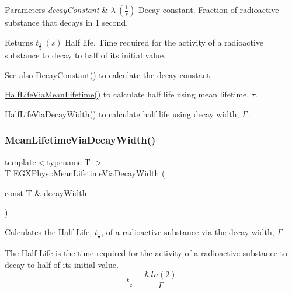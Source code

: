 \begin{DoxyParams}{Parameters}
{\em decay\+Constant} & $\lambda\ (\frac{1}{s})$ Decay constant. Fraction of radioactive substance that decays in 1 second. \\
\hline
\end{DoxyParams}
\begin{DoxyReturn}{Returns}
$t_{\frac{1}{2}}\ (s)$ Half life. Time required for the activity of a radioactive substance to decay to half of its initial value. 
\end{DoxyReturn}
\begin{DoxySeeAlso}{See also}
\mbox{\hyperlink{group___e_g_x_phys-_decay_constant_ga904edce5aad441b4a0873b3b1a83c7f2}{Decay\+Constant()}} to calculate the decay constant. 

\mbox{\hyperlink{group___e_g_x_phys-_half_life_gacddef16b62e98b214ec8dd8af7da7dce}{Half\+Life\+Via\+Mean\+Lifetime()}} to calculate half life using mean lifetime, $\tau$. 

\mbox{\hyperlink{group___e_g_x_phys-_half_life_gaba3fda944d1a68ee1016a1f2f5809359}{Half\+Life\+Via\+Decay\+Width()}} to calculate half life using decay width, $\Gamma$. 
\end{DoxySeeAlso}
\mbox{\label{group___e_g_x_phys-_mean_lifetime_ga8a1dda4168b4b25db93bf1ae7832fd7e}} 
\subsubsection{\texorpdfstring{Mean\+Lifetime\+Via\+Decay\+Width()}{MeanLifetimeViaDecayWidth()}}
{\footnotesize\ttfamily template$<$typename T $>$ \\
T E\+G\+X\+Phys\+::\+Mean\+Lifetime\+Via\+Decay\+Width (\begin{DoxyParamCaption}\item[{const T \&}]{decay\+Width }\end{DoxyParamCaption})}



Calculates the Half Life, $t_{\frac{1}{2}}$, of a radioactive substance via the decay width, $\Gamma$ . 

The Half Life is the time required for the activity of a radioactive substance to decay to half of its initial value. \[t_{\frac{1}{2}}=\frac{\hbar \ ln(2)}{\Gamma}\]

